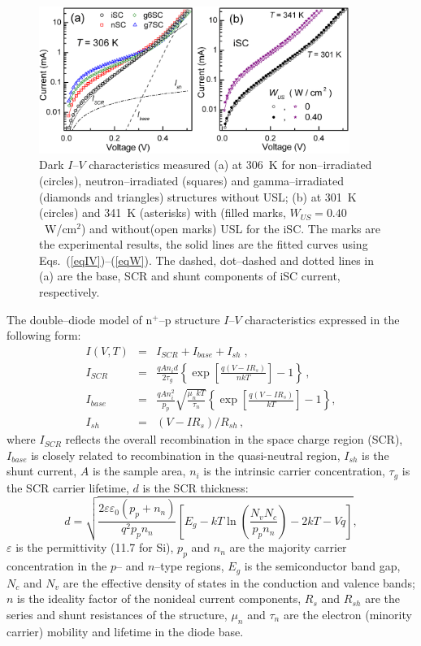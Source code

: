 \documentclass[aip,jap, amsmath,amssymb,reprint]{revtex4-1}
\begin{document}
\begin{figure}
\includegraphics[width=0.9\textwidth]{olikhFig1}%
\caption{\label{figIV}
Dark $I$--$V$ characteristics measured (a) at 306~K for non--irradiated (circles), neutron--irradiated (squares) and gamma--irradiated (diamonds and triangles) structures without USL;
(b) at 301~K (circles) and 341~K (asterisks) with (filled marks, $W_{U\!S}=0.40$~W/cm$^2$) and without(open marks) USL for the iSC.
The marks are the experimental results, the solid lines are the fitted curves using Eqs.~(\ref{eqIV})--(\ref{eqW}).
The dashed, dot--dashed and dotted lines in (a) are the base, SCR and shunt components of iSC current, respectively.
}%
\end{figure}

The double--diode model of n$^+$--p structure $I$--$V$ characteristics expressed in the following form:
\begin{eqnarray}
I(V,T)&=&I_{SCR}+I_{base}+I_{sh}\;,\label{eqIV}\\
I_{SCR}&=&\frac{qAn_id}{2\tau_{g}}\left\{\exp \left[\frac{q(V-IR_s)}{nkT}\right]-1\right\}\,,\label{eqIscr}\\
I_{base}&=&\frac{qAn_i^2}{p_p}\sqrt{\frac{\mu_nkT}{\tau_n}}\left\{\exp \left[\frac{q(V-IR_s)}{kT}\right]-1\right\},\label{eqIbase}\\
I_{sh}&=&(V-IR_s)/R_{sh}\,,\label{eqIsh}
\end{eqnarray}
where
$I_{SCR}$ reflects the overall recombination in the space charge region (SCR),
$I_{base}$ is closely related to recombination in the quasi-neutral region,
$I_{sh}$ is the shunt current,
$A$ is the sample area,
$n_i$ is the intrinsic carrier concentration,
$\tau_{g}$ is the SCR carrier lifetime,
$d$ is the  SCR thickness:
\begin{equation}
\label{eqW}
    d=\sqrt{\frac{2 \varepsilon \varepsilon_0(p_p+n_n)}{q^2 p_p n_n}\left[E_g-kT\ln\!\left(\frac{N_vN_c}{p_pn_n}\right)-2kT\!-\!Vq\right]},
\end{equation}
$\varepsilon$ is the permittivity (11.7 for Si),
$p_p$ and $n_n$ are the majority carrier concentration in the $p$-- and $n$--type regions,
$E_g$ is the semiconductor band gap,
$N_c$ and $N_v$ are the effective density of states in the conduction and valence bands;
$n$ is the ideality factor of the nonideal current components,
$R_s$ and $R_{sh}$ are the series and shunt resistances of the structure,
$\mu_n$ and $\tau_n$ are the electron (minority carrier) mobility and lifetime in the diode base.
\end{document}
